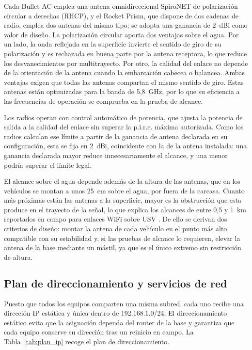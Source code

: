 Cada Bullet AC emplea una antena omnidireccional SpiroNET de polarización circular a derechas (RHCP), y el 
Rocket Prism, que dispone de dos cadenas de radio, emplea dos antenas del mismo tipo; se adopta una ganancia de 
2~dBi como valor de diseño. La polarización circular aporta dos ventajas sobre el agua. Por un lado, la onda 
reflejada en la superficie invierte el sentido de giro de su polarización y es rechazada en buena parte por la 
antena receptora, lo que reduce los desvanecimientos por multitrayecto. Por otro, la calidad del enlace no 
depende de la orientación de la antena cuando la embarcación cabecea o balancea. Ambas ventajas exigen que todas 
las antenas compartan el mismo sentido de giro. Estas antenas están optimizadas para la banda de 5,8~GHz, por lo 
que su eficiencia a las frecuencias de operación se comprueba en la prueba de alcance.
 
Los radios operan con control automático de potencia, que ajusta la potencia de salida a la calidad del enlace 
sin superar la p.i.r.e. máxima autorizada. Como los radios calculan ese límite a partir de la ganancia de antena 
declarada en su configuración, esta se fija en 2~dBi, coincidente con la de la antena instalada: una ganancia 
declarada mayor reduce innecesariamente el alcance, y una menor podría superar el límite legal.
 
El alcance sobre el agua depende además de la altura de las antenas, que en los vehículos se montan a unos 25~cm 
sobre el agua, por fuera de la carcasa. Cuanto más próximas están las antenas a la superficie, mayor es la 
obstrucción que esta produce en el trayecto de la señal, lo que explica los alcances de entre 0,5 y 1~km 
reportados en campo para enlaces WiFi sobre USV \cite{sears2024}. De ello se derivan dos criterios de diseño: 
montar la antena de cada vehículo en el punto más alto compatible con su estabilidad y, si las pruebas de alcance 
lo requieren, elevar la antena de la base mediante un mástil, ya que es el único extremo sin restricción de 
altura.
 
\subsection{Plan de direccionamiento y servicios de red}
\label{subsec:direccionamiento}
 
Puesto que todos los equipos comparten una misma subred, cada uno recibe una dirección IP estática y única dentro 
de 192.168.1.0/24. El direccionamiento estático evita que la asignación dependa del router de la base y garantiza 
que cada equipo conserve su dirección tras un reinicio en campo. La Tabla~\ref{tab:plan_ip} recoge el plan de 
direccionamiento.
 
